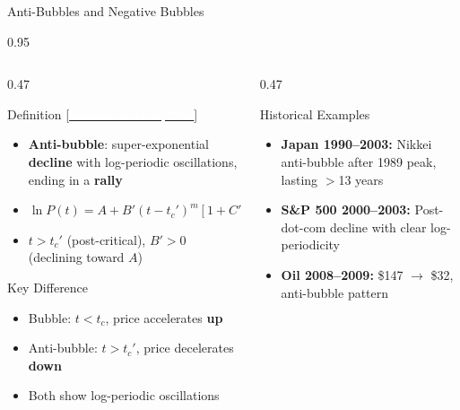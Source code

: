 \documentclass[9pt, aspectratio=169, t]{beamer}
\begin{document}
\begin{frame}{Anti-Bubbles and Negative Bubbles}
    \begin{cminipage}{0.95\textwidth}
    {\scriptsize
    \begin{columns}[T]
        \begin{column}{0.47\textwidth}
            \begin{block}{Definition {\scriptsize[\href{https://doi.org/10.1080/14697688.2002.0000014}{\textcolor{white}{Sornette \& Zhou, 2002}}]}}
                \begin{itemize}\setlength{\itemsep}{0pt}
                    \item \textbf{Anti-bubble}: super-exponential \textbf{decline} with log-periodic oscillations, ending in a \textbf{rally}
                    \item $\ln P(t) = A + B'(t - t_c')^m[1 + C'\cos(\omega\ln(t - t_c') + \phi')]$
                    \item $t > t_c'$ (post-critical), $B' > 0$ (declining toward $A$)
                \end{itemize}
            \end{block}
            \vspace{-1mm}
            \begin{exampleblock}{Key Difference}
                \begin{itemize}\setlength{\itemsep}{0pt}
                    \item Bubble: $t < t_c$, price accelerates \textbf{up}
                    \item Anti-bubble: $t > t_c'$, price decelerates \textbf{down}
                    \item Both show log-periodic oscillations
                \end{itemize}
            \end{exampleblock}
        \end{column}
        \begin{column}{0.47\textwidth}
            \begin{block}{Historical Examples}
                \begin{itemize}\setlength{\itemsep}{1pt}
                    \item \textbf{Japan 1990--2003:} Nikkei anti-bubble after 1989 peak, lasting $>$13 years
                    \item \textbf{S\&P 500 2000--2003:} Post-dot-com decline with clear log-periodicity
                    \item \textbf{Oil 2008--2009:} \$147 $\to$ \$32, anti-bubble pattern
                \end{itemize}
            \end{block}


\end{column}
\end{columns}}
\end{cminipage}
\end{frame}
\end{document}
